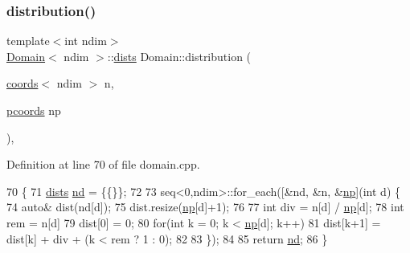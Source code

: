 \subsubsection{\texorpdfstring{distribution()}{distribution()}}
{\footnotesize\ttfamily template$<$int ndim$>$ \\
\hyperlink{classshark_1_1ndim_1_1_domain}{Domain}$<$ ndim $>$\+::\hyperlink{classshark_1_1ndim_1_1_domain_a8d425ae958ccde33494fe1346307e991}{dists} Domain\+::distribution (\begin{DoxyParamCaption}\item[{\hyperlink{structshark_1_1ndim_1_1coords}{coords}$<$ ndim $>$}]{n,  }\item[{\hyperlink{classshark_1_1ndim_1_1_domain_a9684ccd8af33cff7639c782290ac37ee}{pcoords}}]{np }\end{DoxyParamCaption})\hspace{0.3cm}{\ttfamily [static]}, {\ttfamily [private]}}



Definition at line 70 of file domain.\+cpp.


\begin{DoxyCode}
70                                                                                 \{
71     \hyperlink{classshark_1_1ndim_1_1_domain_a8d425ae958ccde33494fe1346307e991}{dists} \hyperlink{classshark_1_1ndim_1_1_domain_a4964336cc4ccdb2bfcc616fdcbb9a570}{nd} = \{\{\}\};
72 
73     seq<0,ndim>::for\_each([&nd, &n, &\hyperlink{classshark_1_1ndim_1_1_domain_a1d15ab99cb54dcc456c5bba8699bcddf}{np}](\textcolor{keywordtype}{int} d) \{
74         \textcolor{keyword}{auto}& dist(nd[d]);
75         dist.resize(\hyperlink{classshark_1_1ndim_1_1_domain_a1d15ab99cb54dcc456c5bba8699bcddf}{np}[d]+1);
76 
77         \textcolor{keywordtype}{int} div = n[d] / \hyperlink{classshark_1_1ndim_1_1_domain_a1d15ab99cb54dcc456c5bba8699bcddf}{np}[d];
78         \textcolor{keywordtype}{int} rem = n[d] %
79         dist[0] = 0;
80         \textcolor{keywordflow}{for}(\textcolor{keywordtype}{int} k = 0; k < \hyperlink{classshark_1_1ndim_1_1_domain_a1d15ab99cb54dcc456c5bba8699bcddf}{np}[d]; k++)
81             dist[k+1] = dist[k] + div + (k < rem ? 1 : 0);
82 
83     \});
84 
85     \textcolor{keywordflow}{return} \hyperlink{classshark_1_1ndim_1_1_domain_a4964336cc4ccdb2bfcc616fdcbb9a570}{nd};
86 \}
\end{DoxyCode}
\hypertarget{classshark_1_1ndim_1_1_domain_a9b488b909423d2decfce5aa505b78583}{}\label{classshark_1_1ndim_1_1_domain_a9b488b909423d2decfce5aa505b78583} 
